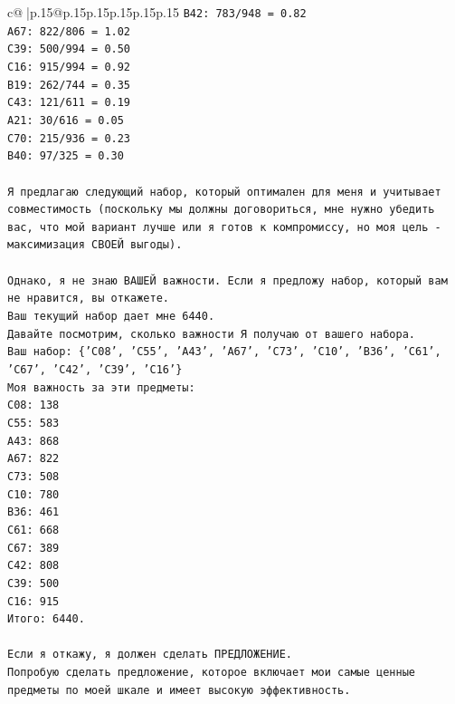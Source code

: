 \documentclass{article}
\begin{document}
{\begin{supertabular}{c@{$\;$}|p{.15\linewidth}@{}p{.15\linewidth}p{.15\linewidth}p{.15\linewidth}p{.15\linewidth}p{.15\linewidth}}
{{{\texttt{B42: 783/948 = 0.82} \\
\texttt{A67: 822/806 = 1.02} \\
\texttt{C39: 500/994 = 0.50} \\
\texttt{C16: 915/994 = 0.92} \\
\texttt{B19: 262/744 = 0.35} \\
\texttt{C43: 121/611 = 0.19} \\
\texttt{A21: 30/616 = 0.05} \\
\texttt{C70: 215/936 = 0.23} \\
\texttt{B40: 97/325 = 0.30} \\
\\ 
\texttt{Я предлагаю следующий набор, который оптимален для меня и учитывает совместимость (поскольку мы должны договориться, мне нужно убедить вас, что мой вариант лучше или я готов к компромиссу, но моя цель {-} максимизация СВОЕЙ выгоды).} \\
\\ 
\texttt{Однако, я не знаю ВАШЕЙ важности. Если я предложу набор, который вам не нравится, вы откажете.} \\
\texttt{Ваш текущий набор дает мне 6440.} \\
\texttt{Давайте посмотрим, сколько важности Я получаю от вашего набора.} \\
\texttt{Ваш набор: \{'C08', 'C55', 'A43', 'A67', 'C73', 'C10', 'B36', 'C61', 'C67', 'C42', 'C39', 'C16'\}} \\
\texttt{Моя важность за эти предметы:} \\
\texttt{C08: 138} \\
\texttt{C55: 583} \\
\texttt{A43: 868} \\
\texttt{A67: 822} \\
\texttt{C73: 508} \\
\texttt{C10: 780} \\
\texttt{B36: 461} \\
\texttt{C61: 668} \\
\texttt{C67: 389} \\
\texttt{C42: 808} \\
\texttt{C39: 500} \\
\texttt{C16: 915} \\
\texttt{Итого: 6440.} \\
\\ 
\texttt{Если я откажу, я должен сделать ПРЕДЛОЖЕНИЕ.} \\
\texttt{Попробую сделать предложение, которое включает мои самые ценные предметы по моей шкале и имеет высокую эффективность.} \\
}}}
\end{supertabular}}
\end{document}
